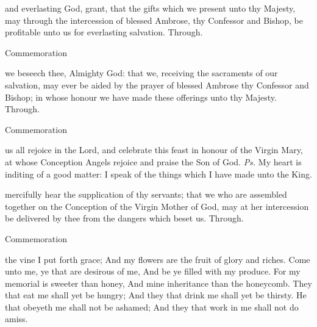 
\secret
{} and everlasting God, grant, that the gifts which we present unto thy Majesty, may through the intercession of blessed Ambrose, thy Confessor and Bishop, be profitable unto us for everlasting salvation. Through.

\begin{rubric}
	Commemoration 
\end{rubric}


\postcommunion
{} we beseech thee, Almighty God: that we, receiving the sacraments of our salvation, may ever be aided by the prayer of blessed Ambrose thy Confessor and Bishop; in whose honour we have made these offerings unto thy Majesty. Through.

\begin{rubric}
	Commemoration %
\end{rubric}


\label{ConceptionBVM}

\introit
{} us all rejoice in the Lord, and celebrate this feast in honour of the Virgin Mary, at whose Conception Angels rejoice and praise the Son of God. \textit{Ps.} My heart is inditing of a good matter: I speak of the things which I have made unto the King.

\collect
{} mercifully hear the supplication of thy servants; that we who are assembled together on the Conception of the Virgin Mother of God, may at her intercession be delivered by thee from the dangers which beset us. Through.
\begin{rubric}
    Commemoration 
\end{rubric}

 the vine I put forth grace; And my flowers are the fruit of glory and riches. Come unto me, ye that are desirous of me, And be ye filled with my produce. For my memorial is sweeter than honey, And mine inheritance than the honeycomb. They that eat me shall yet be hungry; And they that drink me shall yet be thirsty. He that obeyeth me shall not be ashamed; And they that work in me shall not do amiss.

